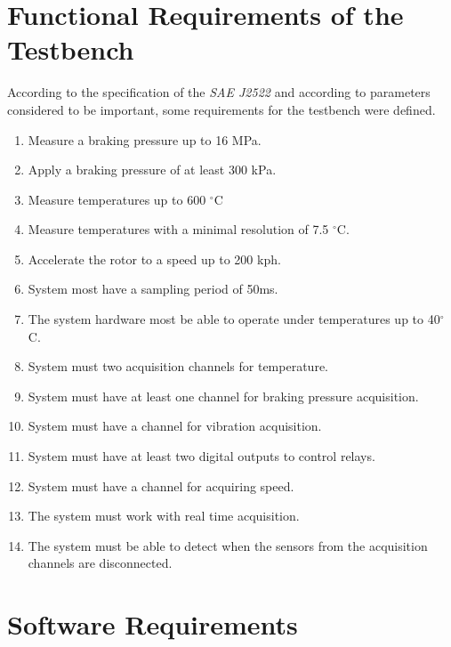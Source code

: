 \section{Functional Requirements of the Testbench}\label{sec:functionalRequirements}

	According to the specification of the \textit{SAE J2522} and according to parameters considered to be important, some requirements for the testbench were defined.

	\begin{enumerate}
		\item Measure a braking pressure up to 16 MPa.\label{itm:func-req-1}
		\item Apply a braking pressure of at least 300 kPa.\label{itm:func-req-2}
		\item Measure temperatures up to 600 $^{\circ}$C\label{itm:func-req-3}
		\item Measure temperatures with a minimal resolution of 7.5 $^{\circ}$C.\label{itm:func-req-4}
		\item Accelerate the rotor to a speed up to 200 kph.\label{itm:func-req-5}
		\item System most have a sampling period of 50ms.\label{itm:func-req-6}
		\item The system hardware most be able to operate under temperatures up to 40$^{\circ}$C.\label{itm:func-req-7}
		\item System must two acquisition channels for temperature.\label{itm:func-req-8}
		\item System must have at least one channel for braking pressure acquisition.\label{itm:func-req-9}
		\item System must have a channel for vibration acquisition.\label{itm:func-req-10}
		\item System must have at least two digital outputs to control relays.\label{itm:func-req-11}
		\item System must have a channel for acquiring speed.\label{itm:func-req-12}
		\item The system must work with real time acquisition.\label{itm:func-req-13}
		\item The system must be able to detect when the sensors from the acquisition channels are disconnected.\label{itm:func-req-14}
	\end{enumerate}
	
\section{Software Requirements}\label{sec:software-requirements}
	
